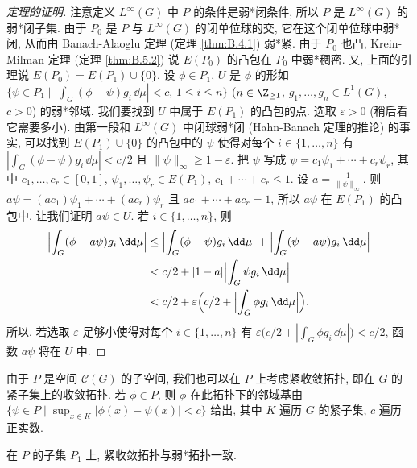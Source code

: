 \begin{proof}[定理的证明]
注意定义 $L^{\infty}(G)$ 中 $P$ 的条件是弱*闭条件, 所以 $P$ 是 $L^{\infty}(G)$ 的弱*闭子集. 由于 $P_0$ 是 $P$ 与 $L^{\infty}(G)$ 的闭单位球的交, 它在这个闭单位球中弱*闭, 从而由 Banach-Alaoglu 定理 (定理 \ref{thm:B.4.1}) 弱*紧. 由于 $P_0$ 也凸, Krein-Milman 定理 (定理 \ref{thm:B.5.2}) 说 $E(P_0)$ 的凸包在 $P_0$ 中弱*稠密. 又, 上面的引理说 $E(P_0) = E(P_1) \cup \{0\}$.
设 $\phi \in P_1$, $U$ 是 $\phi$ 的形如 $\{\psi \in P_1 \mid |\int_G (\phi - \psi)g_i\,\dd\mu| < c,\, 1 \leq i \leq n\}$ ($n \in \Z_{\geq 1}$, $g_1, \ldots, g_n \in L^1(G)$, $c > 0$) 的弱*邻域. 我们要找到 $U$ 中属于 $E(P_1)$ 的凸包的点. 选取 $\varepsilon > 0$ (稍后看它需要多小). 由第一段和 $L^{\infty}(G)$ 中闭球弱*闭 (Hahn-Banach 定理的推论) 的事实, 可以找到 $E(P_1) \cup \{0\}$ 的凸包中的 $\psi$ 使得对每个 $i \in \{1, \ldots, n\}$ 有 $|\int_G (\phi - \psi)g_i\,\dd\mu| < c/2$ 且 $\|\psi\|_{\infty} \geq 1 - \varepsilon$. 把 $\psi$ 写成 $\psi = c_1\psi_1 + \cdots + c_r\psi_r$, 其中 $c_1, \ldots, c_r \in [0, 1]$, $\psi_1, \ldots, \psi_r \in E(P_1)$, $c_1 + \cdots + c_r \leq 1$. 设 $a = \frac{1}{\|\psi\|_{\infty}}$. 则 $a\psi = (ac_1)\psi_1 + \cdots + (ac_r)\psi_r$ 且 $ac_1 + \cdots + ac_r = 1$, 所以 $a\psi$ 在 $E(P_1)$ 的凸包中. 让我们证明 $a\psi \in U$. 若 $i \in \{1, \ldots, n\}$, 则
\begin{align*}
\Bigl|\int_G (\phi - a\psi)g_i\,\dd\mu\Bigr| &\leq \Bigl|\int_G (\phi - \psi)g_i\,\dd\mu\Bigr| + \Bigl|\int_G (\psi - a\psi)g_i\,\dd\mu\Bigr| \\
&< c/2 + |1 - a|\Bigl|\int_G \psi g_i\,\dd\mu\Bigr| \\
&< c/2 + \varepsilon\Bigl(c/2 + \Bigl|\int_G \phi g_i\,\dd\mu\Bigr|\Bigr).
\end{align*}
所以, 若选取 $\varepsilon$ 足够小使得对每个 $i \in \{1, \ldots, n\}$ 有 $\varepsilon\bigl(c/2 + |\int_G \phi g_i\,\dd\mu|\bigr) < c/2$, 函数 $a\psi$ 将在 $U$ 中.
\end{proof}

由于 $P$ 是空间 $\mathcal{C}(G)$ 的子空间, 我们也可以在 $P$ 上考虑紧收敛拓扑, 即在 $G$ 的紧子集上的收敛拓扑. 若 $\phi \in P$, 则 $\phi$ 在此拓扑下的邻域基由 $\{\psi \in P \mid \sup_{x \in K}|\phi(x) - \psi(x)| < c\}$ 给出, 其中 $K$ 遍历 $G$ 的紧子集, $c$ 遍历正实数.

\begin{theorem}[Raikov 定理]
\label{thm:III.4.3}
在 $P$ 的子集 $P_1$ 上, 紧收敛拓扑与弱*拓扑一致.
\end{theorem}

